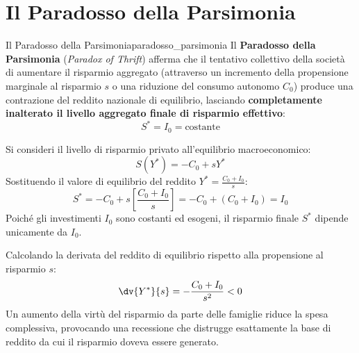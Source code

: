 \section{Il Paradosso della Parsimonia}

\begin{modello}{Il Paradosso della Parsimonia}{paradosso_parsimonia}
Il \textbf{Paradosso della Parsimonia} (\textit{Paradox of Thrift}) afferma che il tentativo collettivo della società di aumentare il risparmio aggregato (attraverso un incremento della propensione marginale al risparmio $s$ o una riduzione del consumo autonomo $C_0$) produce una contrazione del reddito nazionale di equilibrio, lasciando \textbf{completamente inalterato il livello aggregato finale di risparmio effettivo}:
\begin{equation}
    S^* = I_0 = \text{costante}
\end{equation}
\end{modello}

\begin{dimostrazione}
Si consideri il livello di risparmio privato all'equilibrio macroeconomico:
\begin{equation}
    S(Y^*) = -C_0 + s Y^*
\end{equation}
Sostituendo il valore di equilibrio del reddito $Y^* = \frac{C_0 + I_0}{s}$:
\begin{equation}
    S^* = -C_0 + s \left[ \frac{C_0 + I_0}{s} \right] = -C_0 + (C_0 + I_0) = I_0
\end{equation}
Poiché gli investimenti $I_0$ sono costanti ed esogeni, il risparmio finale $S^*$ dipende unicamente da $I_0$.

Calcolando la derivata del reddito di equilibrio rispetto alla propensione al risparmio $s$:
\begin{equation}
    \dv{Y^*}{s} = -\frac{C_0 + I_0}{s^2} < 0
\end{equation}
Un aumento della virtù del risparmio da parte delle famiglie riduce la spesa complessiva, provocando una recessione che distrugge esattamente la base di reddito da cui il risparmio doveva essere generato.
\end{dimostrazione}

